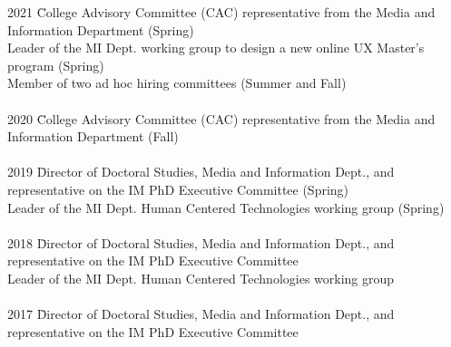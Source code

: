 \documentclass[9pt]{extarticle}
\begin{document}
\begin{tabbing}
2021 \hspace{0.3in}\= College Advisory Committee (CAC) representative from the Media and \\ 
\> \hspace{0.5cm} Information Department (Spring) \\
\> Leader of the MI Dept. working group to design a new online UX Master's \\
\> \hspace{0.5cm} program (Spring) \\
\> Member of two ad hoc hiring committees (Summer and Fall) \\\\

2020 \hspace{0.3in}\= College Advisory Committee (CAC) representative from the Media and \\ 
\> \hspace{0.5cm} Information Department (Fall) \\\\

2019 \hspace{0.3in}\= Director of Doctoral Studies, Media and Information Dept., and \\
\> \hspace{0.5cm} representative on the IM PhD Executive Committee (Spring) \\
\> Leader of the MI Dept. Human Centered Technologies working group (Spring) \\\\

2018 \hspace{0.3in}\= Director of Doctoral Studies, Media and Information Dept., and \\
\> \hspace{0.5cm} representative on the IM PhD Executive Committee \\
\> Leader of the MI Dept. Human Centered Technologies working group \\\\

2017 \hspace{0.3in}\= Director of Doctoral Studies, Media and Information Dept., and \\
\> \hspace{0.5cm} representative on the IM PhD Executive Committee \\\\


\end{tabbing}
\end{document}
